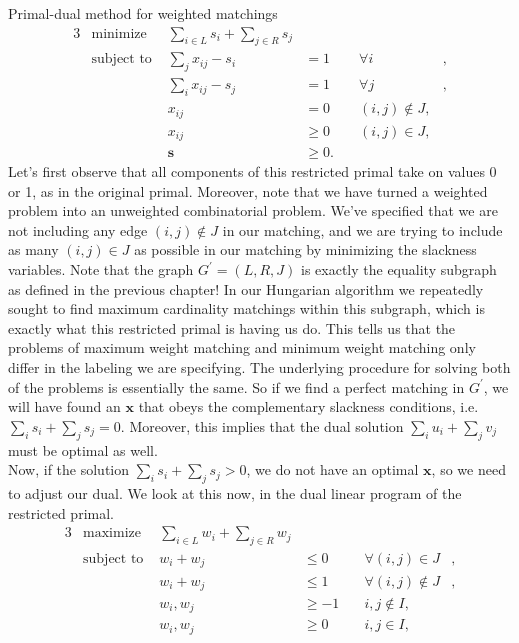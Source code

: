 \documentclass[11pt]{article}
\renewcommand{\'}{^{'}}
\begin{document}
\begin{section}{Primal-dual method for weighted matchings}
\begin{alignat}{3}
		& \text{minimize } & \sum_{i\in L} s_i + \sum_{j\in R} s_j & \\
		& \text{subject to } & \sum_j x_{ij} - s_i & = 1 & \quad \forall i &, \\
				     && \sum_i x_{ij} - s_j & = 1 & \quad \forall j &, \\
				     && x_{ij} & = 0 & \quad (i,j)\notin J, \\
				     && x_{ij} & \geq 0 & \quad (i,j)\in J, \\
				     && \mathbf{s} & \geq 0.
	\end{alignat}
	Let's first observe that all components of this restricted primal take on values 0 or 1, as 
	in the original primal. Moreover, note that we have turned a weighted problem into an 
	unweighted combinatorial problem. We've specified that we are not including any edge 
	$(i,j)\notin J$ in our matching, and we are trying to include as many $(i,j)\in J$ as possible 
	in our matching by minimizing the slackness variables. Note that the graph $G^{'} = (L,R,J)$ 
	is exactly the equality subgraph as defined in the previous chapter! In our Hungarian algorithm 
	we repeatedly sought to find maximum cardinality matchings within this subgraph, which is 
	exactly what this restricted primal is having us do. This tells us that the problems of maximum 
	weight matching and minimum weight matching only differ in the labeling we are specifying. The 
	underlying procedure for solving both of the problems is essentially the same. So if we find a 
	perfect matching in $G^{'}$, we will have found an $\mathbf{x}$ that obeys the complementary 
	slackness conditions, i.e. $\sum_i s_i + \sum_j s_j = 0$. Moreover, this implies that the 
	dual solution $\sum_i u_i + \sum_j v_j$ must be optimal as well.\\
	Now, if the solution $\sum_i s_i + \sum_j s_j > 0$, we do not have an optimal $\mathbf{x}$, 
	so we need to adjust our dual. We look at this now, in the dual linear program of the 
	restricted primal.
	\begin{alignat}{3}
		& \text{maximize } & \sum_{i\in L} w_i + \sum_{j\in R} w_j & \\
		& \text{subject to } & w_i + w_j & \leq 0 & \quad \forall (i,j)\in J &, \\
				     && w_i + w_j & \leq 1 & \quad \forall (i,j)\notin J &, \\
				     && w_i,w_j & \geq -1 & \quad i,j\notin I, \\
				     && w_i,w_j & \geq 0 & \quad i,j\in I, \\

\end{alignat}
\end{section}
\end{document}
